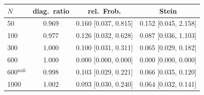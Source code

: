 \begin{tabular}{lccc}
\toprule
$N$ & diag.\ ratio & rel.\ Frob. & Stein \\
\midrule
50 & 0.969 & 0.160 [0.037, 0.815] & 0.152 [0.045, 2.158] \\
100 & 0.977 & 0.126 [0.032, 0.628] & 0.087 [0.036, 1.103] \\
300 & 1.000 & 0.100 [0.031, 0.311] & 0.065 [0.029, 0.182] \\
600 & 1.000 & 0.000 [0.000, 0.000] & 0.000 [0.000, 0.000] \\
600$^{\mathrm{null}}$ & 0.998 & 0.103 [0.029, 0.221] & 0.066 [0.035, 0.120] \\
1000 & 1.002 & 0.093 [0.030, 0.240] & 0.064 [0.032, 0.141] \\
\bottomrule
\end{tabular}
